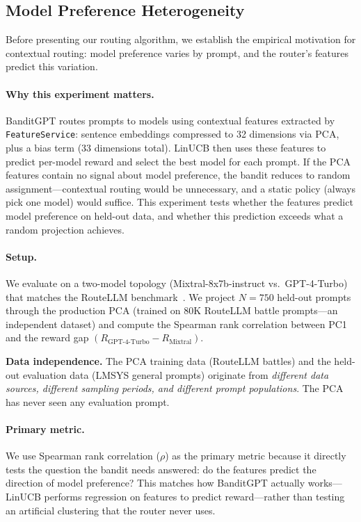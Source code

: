 
\subsection{Model Preference Heterogeneity}
\label{sec:semantic_structure}

Before presenting our routing algorithm, we establish the empirical motivation for contextual routing: model preference varies by prompt, and the router's features predict this variation.

\paragraph{Why this experiment matters.}
BanditGPT routes prompts to models using contextual features extracted by \texttt{FeatureService}: sentence embeddings compressed to 32 dimensions via PCA, plus a bias term (33 dimensions total).
LinUCB then uses these features to predict per-model reward and select the best model for each prompt.
If the PCA features contain no signal about model preference, the bandit reduces to random assignment---contextual routing would be unnecessary, and a static policy (always pick one model) would suffice.
This experiment tests whether the features predict model preference on held-out data, and whether this prediction exceeds what a random projection achieves.

\paragraph{Setup.}
We evaluate on a two-model topology (Mixtral-8x7b-instruct vs.\ GPT-4-Turbo) that matches the RouteLLM benchmark~\cite{ong2024routellm}.
We project $N=750$ held-out prompts through the production PCA (trained on 80K RouteLLM battle prompts---an independent dataset) and compute the Spearman rank correlation between PC1 and the reward gap $(R_{\text{GPT-4-Turbo}} - R_{\text{Mixtral}})$.

\noindent\textbf{Data independence.}
The PCA training data (RouteLLM battles) and the held-out evaluation data (LMSYS general prompts) originate from \emph{different data sources, different sampling periods, and different prompt populations}.
The PCA has never seen any evaluation prompt.

\paragraph{Primary metric.}
We use Spearman rank correlation ($\rho$) as the primary metric because it directly tests the question the bandit needs answered: do the features predict the direction of model preference?
This matches how BanditGPT actually works---LinUCB performs regression on features to predict reward---rather than testing an artificial clustering that the router never uses.


